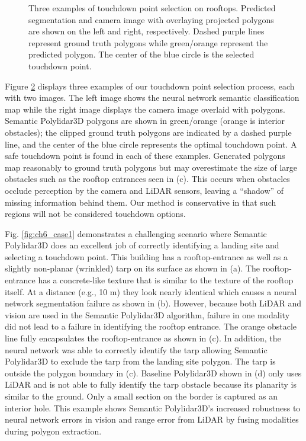 \begin{figure}[!t]
\begin{subfigure}{.32\linewidth}
    \caption{\label{fig:ch6_qualitative_d}}
  \end{subfigure}
  \caption[Three examples of touchdown point selection on rooftops.]{Three examples of touchdown point selection on rooftops. Predicted segmentation and camera image with overlaying projected polygons are shown on the left and right, respectively. Dashed purple lines represent ground truth polygons while green/orange represent the predicted polygon. The center of the blue circle is the selected touchdown point.     }\label{fig:ch6_qualitative}
\end{figure}

Figure \ref{fig:ch6_qualitative} displays three examples of our touchdown point selection process, each with two images. The left image shows the neural network semantic classification map while the right image displays the camera image overlaid with polygons.  Semantic Polylidar3D polygons are shown in green/orange (orange is interior obstacles); the clipped ground truth polygons are indicated by a dashed purple line, and the center of the blue circle represents the optimal touchdown point. A safe touchdown point is found in each of these examples.  Generated polygons map reasonably to ground truth polygons but may overestimate the size of large obstacles such as the rooftop entrances seen in (c). This occurs when obstacles occlude perception by the camera and LiDAR sensors, leaving a ``shadow'' of missing information behind them. Our method is conservative in that such regions will not be considered touchdown options. 

Fig. \ref{fig:ch6_case1} demonstrates a challenging scenario where Semantic Polylidar3D does an excellent job of correctly identifying a landing site and selecting a touchdown point. This building has a rooftop-entrance as well as a slightly non-planar (wrinkled) tarp on its surface as shown in (a). The rooftop-entrance has a concrete-like texture that is similar to the texture of the rooftop itself. At a distance (e.g., 10 m) they look nearly identical which causes a neural network segmentation failure as shown in (b). However, because both LiDAR and vision are used in the Semantic Polylidar3D algorithm,  failure in one modality did not lead to a failure in identifying the rooftop entrance. The orange obstacle line fully encapsulates the rooftop-entrance as shown in (c). In addition, the neural network was able to correctly identify the tarp allowing Semantic Polylidar3D to exclude the tarp from the landing site polygon. The tarp is outside the polygon boundary in (c). Baseline Polylidar3D shown in (d) only uses LiDAR and is not able to fully identify the tarp obstacle because its planarity is similar to the ground. Only a small section on the border is captured as an interior hole. This example shows Semantic Polylidar3D's increased robustness to neural network errors in vision and range error from LiDAR by fusing modalities during polygon extraction. 

